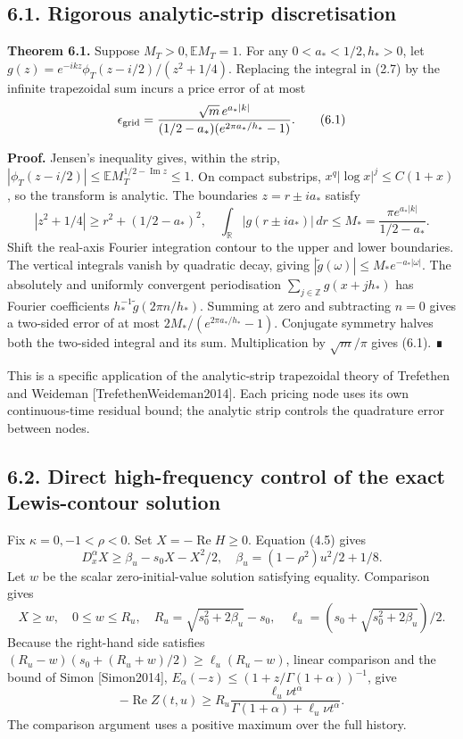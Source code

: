 \documentclass[a4paper,11pt]{article}
\begin{document}
\subsection*{6.1. Rigorous analytic-strip discretisation}

\textbf{Theorem 6.1.} Suppose \(M_T>0,\mathbb E M_T=1\). For any \(0<a_*<1/2,h_*>0\), let
\(g(z)=e^{-ikz}\phi_T(z-i/2)/(z^2+1/4)\). Replacing the integral in (2.7) by the infinite trapezoidal sum incurs a price error of at most
\[
\epsilon_{\rm grid}
=\frac{\sqrt m\,e^{a_*|k|}}
{(1/2-a_*)(e^{2\pi a_*/h_*}-1)}.
\tag{6.1}
\]

\textbf{Proof.} Jensen's inequality gives, within the strip,
\(|\phi_T(z-i/2)|\le\mathbb E M_T^{1/2-\operatorname{Im}z}\le1\).
On compact substrips, \(x^q|\log x|^j\le C(1+x)\), so the transform is analytic. The boundaries \(z=r\pm ia_*\) satisfy
\[
|z^2+1/4|\ge r^2+(1/2-a_*)^2,\quad
\int_{\mathbb R}|g(r\pm ia_*)|\,dr
\le M_*=\frac{\pi e^{a_*|k|}}{1/2-a_*}.
\]
Shift the real-axis Fourier integration contour to the upper and lower boundaries. The vertical integrals vanish by quadratic decay, giving
\(|\widetilde g(\omega)|\le M_*e^{-a_*|\omega|}\).
The absolutely and uniformly convergent periodisation \(\sum_{j\in\mathbb Z}g(x+jh_*)\) has Fourier coefficients
\(h_*^{-1}\widetilde g(2\pi n/h_*)\). Summing at zero and subtracting \(n=0\) gives a two-sided error of at most
\(2M_* /(e^{2\pi a_*/h_*}-1)\).
Conjugate symmetry halves both the two-sided integral and its sum. Multiplication by \(\sqrt m/\pi\) gives (6.1). ∎

This is a specific application of the analytic-strip trapezoidal theory of Trefethen and Weideman [TrefethenWeideman2014]. Each pricing node uses its own continuous-time residual bound; the analytic strip controls the quadrature error between nodes.

\subsection*{6.2. Direct high-frequency control of the exact Lewis-contour solution}

Fix \(\kappa=0,-1<\rho<0\). Set \(X=-\operatorname{Re}H\ge0\). Equation (4.5) gives
\[
D_x^\alpha X\ge\beta_u-s_0X-X^2/2,\quad
\beta_u=(1-\rho^2)u^2/2+1/8.
\tag{6.2}
\]
Let \(w\) be the scalar zero-initial-value solution satisfying equality. Comparison gives
\[
X\ge w,\quad 0\le w\le R_u,\quad
R_u=\sqrt{s_0^2+2\beta_u}-s_0,\quad
\ell_u=(s_0+\sqrt{s_0^2+2\beta_u})/2.
\]
Because the right-hand side satisfies \((R_u-w)(s_0+(R_u+w)/2)\ge\ell_u(R_u-w)\), linear comparison and the bound of Simon [Simon2014],
\(E_\alpha(-z)\le(1+z/\Gamma(1+\alpha))^{-1}\), give
\[
-\operatorname{Re}Z(t,u)\ge
R_u\frac{\ell_u\nu t^\alpha}{\Gamma(1+\alpha)+\ell_u\nu t^\alpha}.
\tag{6.3}
\]
The comparison argument uses a positive maximum over the full history.
\end{document}
